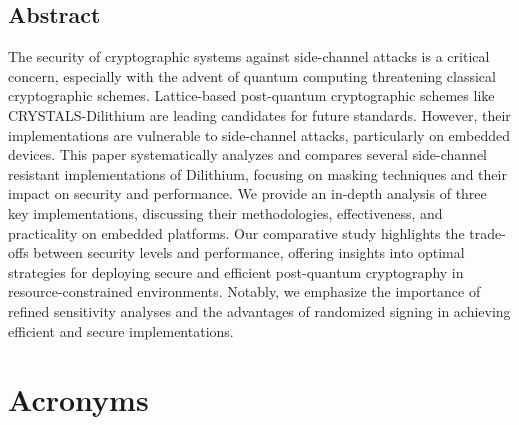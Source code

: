 \documentclass[a4paper,12pt,oneside,openany,headsepline,bibliography=totocnumbered]{scrbook}
\begin{document}


\section*{Abstract}
\thispagestyle{abstract}

The security of cryptographic systems against side-channel attacks is a critical concern, especially with the advent of quantum computing threatening classical cryptographic schemes. Lattice-based post-quantum cryptographic schemes like CRYSTALS-Dilithium are leading candidates for future standards. However, their implementations are vulnerable to side-channel attacks, particularly on embedded devices. This paper systematically analyzes and compares several side-channel resistant implementations of Dilithium, focusing on masking techniques and their impact on security and performance. We provide an in-depth analysis of three key implementations, discussing their methodologies, effectiveness, and practicality on embedded platforms. Our comparative study highlights the trade-offs between security levels and performance, offering insights into optimal strategies for deploying secure and efficient post-quantum cryptography in resource-constrained environments. Notably, we emphasize the importance of refined sensitivity analyses and the advantages of randomized signing in achieving efficient and secure implementations.

\tableofcontents
\thispagestyle{contents}

\chapter*{Acronyms}
\thispagestyle{acronyms}
\begin{acronym}[PQC]
\end{acronym}







\newpage
\listoffigures
\thispagestyle{listsoffigures}

\listoftables
\thispagestyle{listoftables}

\newpage


\thispagestyle{bibliography}
\end{document}
